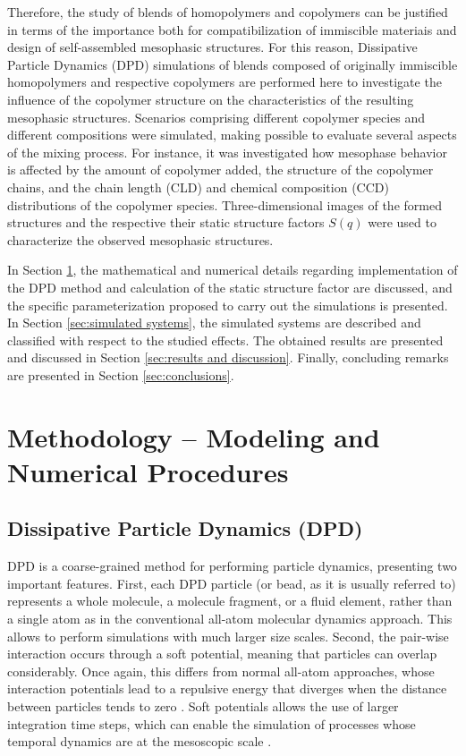 \documentclass[
aip,
jcp,
reprint,
]{revtex4-1}
\begin{document}
Therefore, the study of blends of homopolymers and copolymers can be justified in terms of the importance both for compatibilization of immiscible materiais and design of self-assembled mesophasic structures.
For this reason, Dissipative Particle Dynamics (DPD) simulations of blends composed of originally immiscible homopolymers and respective copolymers are performed here to investigate the influence of the copolymer structure on the characteristics of the resulting mesophasic structures.
Scenarios comprising different copolymer species and different compositions were simulated, making possible to evaluate several aspects of the mixing process.
For instance, it was investigated how mesophase behavior is affected by the amount of copolymer added, the structure of the copolymer chains, and the chain length (CLD) and chemical composition (CCD) distributions of the copolymer species.
Three-dimensional images of the formed structures and the respective their static structure factors $S(q)$ were used to characterize the observed mesophasic structures.

In Section \ref{sec:methodology}, the mathematical and numerical details regarding implementation of the DPD method and calculation of the static structure factor are discussed, and the specific parameterization proposed to carry out the simulations is presented.
In Section \ref{sec:simulated systems}, the simulated systems are described and classified with respect to the studied effects.
The obtained results are presented and discussed in Section \ref{sec:results and discussion}.
Finally, concluding remarks are presented in Section \ref{sec:conclusions}.

\section{Methodology – Modeling and Numerical Procedures}
\label{sec:methodology}

\subsection{Dissipative Particle Dynamics (DPD)}
\label{sec:dpd}

DPD \cite{Hoogerbrugge_1992} is a coarse-grained method for performing particle dynamics, presenting two important features.
First, each DPD particle (or bead, as it is usually referred to) represents a whole molecule, a molecule fragment, or a fluid element, rather than a single atom as in the conventional all-atom molecular dynamics approach.
This allows to perform simulations with much larger size scales.
Second, the pair-wise interaction occurs through a soft potential, meaning that particles can overlap considerably.
Once again, this differs from normal all-atom approaches, whose interaction potentials lead to a repulsive energy that diverges when the distance between particles tends to zero \cite{Frenkel_2002}.
Soft potentials allows the use of larger integration time steps, which can enable the simulation of processes whose temporal dynamics are at the mesoscopic scale \cite{Hoogerbrugge_1992, Espanol_1995}.
\end{document}
